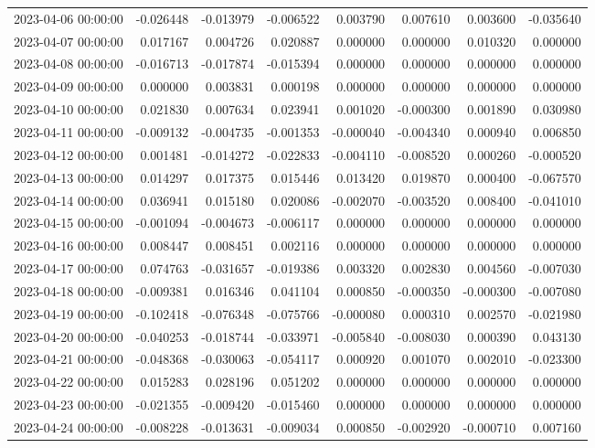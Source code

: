 \begin{tabular}{lrrrrrrr}
2023-04-06 00:00:00 & -0.026448 & -0.013979 & -0.006522 & 0.003790 & 0.007610 & 0.003600 & -0.035640 \\
2023-04-07 00:00:00 & 0.017167 & 0.004726 & 0.020887 & 0.000000 & 0.000000 & 0.010320 & 0.000000 \\
2023-04-08 00:00:00 & -0.016713 & -0.017874 & -0.015394 & 0.000000 & 0.000000 & 0.000000 & 0.000000 \\
2023-04-09 00:00:00 & 0.000000 & 0.003831 & 0.000198 & 0.000000 & 0.000000 & 0.000000 & 0.000000 \\
2023-04-10 00:00:00 & 0.021830 & 0.007634 & 0.023941 & 0.001020 & -0.000300 & 0.001890 & 0.030980 \\
2023-04-11 00:00:00 & -0.009132 & -0.004735 & -0.001353 & -0.000040 & -0.004340 & 0.000940 & 0.006850 \\
2023-04-12 00:00:00 & 0.001481 & -0.014272 & -0.022833 & -0.004110 & -0.008520 & 0.000260 & -0.000520 \\
2023-04-13 00:00:00 & 0.014297 & 0.017375 & 0.015446 & 0.013420 & 0.019870 & 0.000400 & -0.067570 \\
2023-04-14 00:00:00 & 0.036941 & 0.015180 & 0.020086 & -0.002070 & -0.003520 & 0.008400 & -0.041010 \\
2023-04-15 00:00:00 & -0.001094 & -0.004673 & -0.006117 & 0.000000 & 0.000000 & 0.000000 & 0.000000 \\
2023-04-16 00:00:00 & 0.008447 & 0.008451 & 0.002116 & 0.000000 & 0.000000 & 0.000000 & 0.000000 \\
2023-04-17 00:00:00 & 0.074763 & -0.031657 & -0.019386 & 0.003320 & 0.002830 & 0.004560 & -0.007030 \\
2023-04-18 00:00:00 & -0.009381 & 0.016346 & 0.041104 & 0.000850 & -0.000350 & -0.000300 & -0.007080 \\
2023-04-19 00:00:00 & -0.102418 & -0.076348 & -0.075766 & -0.000080 & 0.000310 & 0.002570 & -0.021980 \\
2023-04-20 00:00:00 & -0.040253 & -0.018744 & -0.033971 & -0.005840 & -0.008030 & 0.000390 & 0.043130 \\
2023-04-21 00:00:00 & -0.048368 & -0.030063 & -0.054117 & 0.000920 & 0.001070 & 0.002010 & -0.023300 \\
2023-04-22 00:00:00 & 0.015283 & 0.028196 & 0.051202 & 0.000000 & 0.000000 & 0.000000 & 0.000000 \\
2023-04-23 00:00:00 & -0.021355 & -0.009420 & -0.015460 & 0.000000 & 0.000000 & 0.000000 & 0.000000 \\
2023-04-24 00:00:00 & -0.008228 & -0.013631 & -0.009034 & 0.000850 & -0.002920 & -0.000710 & 0.007160 \\

\end{tabular}
